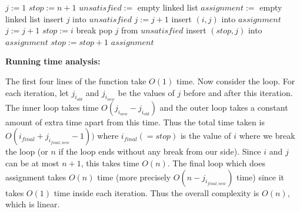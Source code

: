 \documentclass[answers]{exam}
\begin{document}
\begin{questions}
\begin{parts}
\begin{solution}
        \begin{algorithmic}
                \State $j := 1$
                \State $stop := n + 1$
                \State $unsatisfied := $ empty linked list
                \State $assignment := $ empty linked list
                        \State insert $j$ into $unsatisfied$
                        \State $j := j + 1$
                    \EndWhile
                        \State insert $(i, j)$ into $assignment$
                        \State $j := j + 1$
                    \Else
                        \State $stop := i$
                        \State break
                    \EndIf
                \EndFor
                    \State pop $j$ from $unsatisfied$
                    \State insert $(stop, j)$ into $assignment$
                    \State $stop := stop + 1$
                \EndWhile
                \State \Return $assignment$
            \EndFunction
        \end{algorithmic}

        \textbf{Running time analysis:}

The first four lines of the function take $O(1)$ time.
        Now consider the loop. For each iteration, let $j_{i_{old}}$ and $j_{i_{new}}$ be the values of $j$ before and after this iteration. The inner loop takes time $O(j_{i_{new}} - j_{i_{old}})$ and the outer
        loop takes a constant amount of extra time apart from this time. Thus the total time taken is $O(i_{final} + j_{i_{final, new}} - 1))$ where $i_{final} (= stop)$ is the value of $i$ where we break
        the loop (or $n$ if the loop ends without any break from our side). Since $i$ and $j$ can be at most $n + 1$, this takes time $O(n)$. The final loop which does assignment takes $O(n)$ time
        (more precisely $O(n - j_{i_{final, new}})$ time) since it takes $O(1)$ time inside each iteration.
Thus the overall complexity is $O(n)$, which is linear.
    \end{solution}
\end{parts}

\end{questions}
\end{document}
